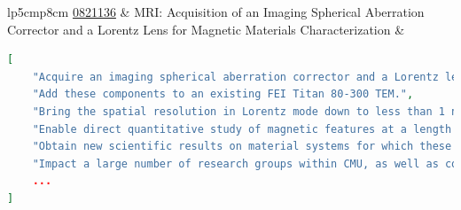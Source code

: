 \documentclass[11pt]{article}
\begin{document}
\begin{table}[h]
\begin{tabular}{lp{5cm}p{8cm}}
         \href{https://www.nsf.gov/awardsearch/showAward?AWD_ID=0821136&HistoricalAwards=false}{0821136} & MRI: Acquisition of an Imaging Spherical Aberration Corrector and a Lorentz Lens for Magnetic Materials Characterization & \begin{minipage}{\linewidth}
\begin{lstlisting}[language=json]
[
    "Acquire an imaging spherical aberration corrector and a Lorentz lens for magnetic materials characterization.",
    "Add these components to an existing FEI Titan 80-300 TEM.",
    "Bring the spatial resolution in Lorentz mode down to less than 1 nm, with negligible delocalization effects.",
    "Enable direct quantitative study of magnetic features at a length scale of around 1 nm.",
    "Obtain new scientific results on material systems for which these observations were previously impossible.",
    "Impact a large number of research groups within CMU, as well as collaborations with local industry and several national laboratories.",
    ...
]
\end{lstlisting}
\end{minipage} \\
    \bottomrule
    \end{tabular}
    \caption{A sample of extracted investigation proposals from the \DatasetNameMatSci~dataset. Award IDs are hyperlinked to the NSF's Award database.}
    \label{tab:ip-examples}
\end{table}
\end{document}
